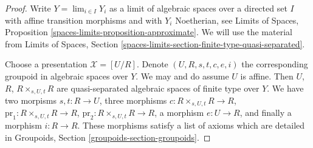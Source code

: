 \documentclass[10pt,a4paper]{amsart}
\theoremstyle{plain}
\theoremstyle{definition}
\theoremstyle{remark}
\numberwithin{equation}{subsection}
\def\lim{\mathop{\mathrm{lim}}\nolimits}
\begin{document}
\begin{proof}
Write $Y = \lim_{i \in I} Y_i$ as a limit of algebraic spaces
over a directed set $I$ with affine transition morphisms and
with $Y_i$ Noetherian, see
Limits of Spaces, Proposition \ref{spaces-limits-proposition-approximate}.
We will use the material from
Limits of Spaces, Section
\ref{spaces-limits-section-finite-type-quasi-separated}.

\medskip\noindent
Choose a presentation $\mathcal{X} = [U/R]$.
Denote $(U, R, s, t, c, e, i)$ the corresponding groupoid
in algebraic spaces over $Y$. We may and do assume $U$ is affine.
Then $U$, $R$, $R \times_{s, U, t} R$ are quasi-separated
algebraic spaces of finite type over $Y$. We have two morpisms
$s, t : R \to U$, three morphisms
$c : R \times_{s, U, t} R \to R$,
$\text{pr}_1 : R \times_{s, U, t} R \to R$,
$\text{pr}_2 : R \times_{s, U, t} R \to R$,
a morphism $e : U \to R$, and finally a morphism $i : R \to R$.
These morphisms satisfy a list of axioms which are detailed
in Groupoids, Section \ref{groupoids-section-groupoids}.


\end{proof}
\end{document}
